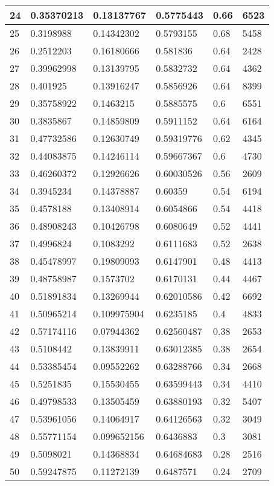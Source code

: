 \begin{longtable}{|l|l|l|l|l|l|}
24 & 0.35370213 & 0.13137767 & 0.5775443 & 0.66 & 6523 \\ \hline 
25 & 0.3198988 & 0.14342302 & 0.5793155 & 0.68 & 5458 \\ \hline 
26 & 0.2512203 & 0.16180666 & 0.581836 & 0.64 & 2428 \\ \hline 
27 & 0.39962998 & 0.13139795 & 0.5832732 & 0.64 & 4362 \\ \hline 
28 & 0.401925 & 0.13916247 & 0.5856926 & 0.64 & 8399 \\ \hline 
29 & 0.35758922 & 0.1463215 & 0.5885575 & 0.6 & 6551 \\ \hline 
30 & 0.3835867 & 0.14859809 & 0.5911152 & 0.64 & 6164 \\ \hline 
31 & 0.47732586 & 0.12630749 & 0.59319776 & 0.62 & 4345 \\ \hline 
32 & 0.44083875 & 0.14246114 & 0.59667367 & 0.6 & 4730 \\ \hline 
33 & 0.46260372 & 0.12926626 & 0.60030526 & 0.56 & 2609 \\ \hline 
34 & 0.3945234 & 0.14378887 & 0.60359 & 0.54 & 6194 \\ \hline 
35 & 0.4578188 & 0.13408914 & 0.6054866 & 0.54 & 4418 \\ \hline 
36 & 0.48908243 & 0.10426798 & 0.6080649 & 0.52 & 4441 \\ \hline 
37 & 0.4996824 & 0.1083292 & 0.6111683 & 0.52 & 2638 \\ \hline 
38 & 0.45478997 & 0.19809093 & 0.6147901 & 0.48 & 4413 \\ \hline 
39 & 0.48758987 & 0.1573702 & 0.6170131 & 0.44 & 4467 \\ \hline 
40 & 0.51891834 & 0.13269944 & 0.62010586 & 0.42 & 6692 \\ \hline 
41 & 0.50965214 & 0.109975904 & 0.6235185 & 0.4 & 4833 \\ \hline 
42 & 0.57174116 & 0.07944362 & 0.62560487 & 0.38 & 2653 \\ \hline 
43 & 0.5108442 & 0.13839911 & 0.63012385 & 0.38 & 2654 \\ \hline 
44 & 0.53385454 & 0.09552262 & 0.63288766 & 0.34 & 2668 \\ \hline 
45 & 0.5251835 & 0.15530455 & 0.63599443 & 0.34 & 4410 \\ \hline 
46 & 0.49798533 & 0.13505459 & 0.63880193 & 0.32 & 5407 \\ \hline 
47 & 0.53961056 & 0.14064917 & 0.64126563 & 0.32 & 3049 \\ \hline 
48 & 0.55771154 & 0.099652156 & 0.6436883 & 0.3 & 3081 \\ \hline 
49 & 0.5098021 & 0.14368834 & 0.64684683 & 0.28 & 2516 \\ \hline 
50 & 0.59247875 & 0.11272139 & 0.6487571 & 0.24 & 2709 \\ \hline 
\end{longtable}